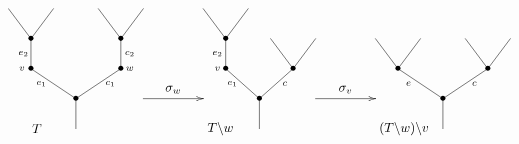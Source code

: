 \documentclass[11pt,a4paper,openright,oneside]{article}
\numberwithin{equation}{section}
\theoremstyle{definition}
\begin{document}
\begin{equation}
    \xy
    <0.08cm, 0cm>:
    (0.0, 0.0)*{}="1"; %
    (0.0, 10.0)*=0{\bullet}="2"; %
    (-15.0, 20.0)*=0{\bullet}="3"; %
    (-15.0, 30.0)*=0{\bullet}="4"; %
    (-22.5, 40.0)*{}="5"; %
    (-7.5, 40.0)*{}="6"; %
    (15.0, 20.0)*=0{\bullet}="7"; %
    (15.0, 30.0)*=0{\bullet}="8"; %
    (7.5, 40.0)*{}="9"; %
    (22.5, 40.0)*{}="10"; %
    "1";"2" **\dir{-};
    "2";"3" **\dir{-};
    "3";"4" **\dir{-};
    "4";"5" **\dir{-};
    "4";"6" **\dir{-};
    "2";"7" **\dir{-};
    "7";"8" **\dir{-};
    "8";"9" **\dir{-};
    "8";"10" **\dir{-};
    (-18.0, 20.0)*=0{\scriptstyle v};
    (-11.5, 15.0)*=0{\scriptstyle e_1};
    (-17.5, 25.0)*=0{\scriptstyle e_2};
    (18.0, 20.0)*=0{\scriptstyle w};
    (11.5, 15.0)*=0{\scriptstyle c_1};
    (18, 25.0)*=0{\scriptstyle c_2};
    (-13,0)*{T};
    \endxy
    \xy
    <0.08cm, 0cm>:
    (-10, 0.0)*{}="1";
    (10, 0.0)*{}="2";
    (10, 10)*{}="3";
    (-10, 0)*{}="4";
    {\ar(-10, 10)*{};(10,10)*{}};
    (0,13)*{\sigma_w};
    \endxy
    \xy
    <0.08cm, 0cm>:
    (0.0, 0.0)*{}="1"; %
    (0.0, 10.0)*=0{\bullet}="2"; %
    (-11.25, 20.0)*=0{\bullet}="3"; %
    (-11.25, 30.0)*=0{\bullet}="4"; %
    (-18.75, 40.0)*{}="5"; %
    (-3.75, 40.0)*{}="6"; %
    (11.25, 20.0)*=0{\bullet}="7"; %
    (3.75, 30.0)*{}="8"; %
    (18.75, 30.0)*{}="9"; %
    "1";"2" **\dir{-};
    "2";"3" **\dir{-};
    "3";"4" **\dir{-};
    "4";"5" **\dir{-};
    "4";"6" **\dir{-};
    "2";"7" **\dir{-};
    "7";"8" **\dir{-};
    "7";"9" **\dir{-};
    (-14.0, 20.0)*=0{\scriptstyle v};
    (-9, 15.0)*=0{\scriptstyle e_1};
    (-14, 25.0)*=0{\scriptstyle e_2};
    (8.5, 15.0)*=0{\scriptstyle c};
    (-13,0)*{T\backslash w};
    \endxy
    \xy
    <0.08cm, 0cm>:
    (-10, 0.0)*{}="1";
    (10, 0.0)*{}="2";
    (10, 10)*{}="3";
    (-10, 0)*{}="4";
    {\ar(-10, 10)*{};(10,10)*{}};
    (0,13)*{\sigma_v};
    \endxy
    \xy
    <0.08cm, 0cm>:
    (0.0, 0.0)*{}="1"; %
    (0.0, 10.0)*=0{\bullet}="2"; %
    (-15.0, 20.0)*=0{\bullet}="3"; %
    (-22.5, 30.0)*{}="4"; %
    (-7.5, 30.0)*{}="5"; %
    (15.0, 20.0)*=0{\bullet}="6"; %
    (7.5, 30.0)*{}="7"; %
    (22.5, 30.0)*{}="8"; %
    "1";"2" **\dir{-};
    "2";"3" **\dir{-};
    "3";"4" **\dir{-};
    "3";"5" **\dir{-};
    "2";"6" **\dir{-};
    "6";"7" **\dir{-};
    "6";"8" **\dir{-};
    (-11.5, 15.0)*=0{\scriptstyle e};
    (10.5, 15.0)*=0{\scriptstyle c};
    (-13,0)*{(T\backslash w)\backslash v};
    \endxy
\end{equation}
\end{document}
